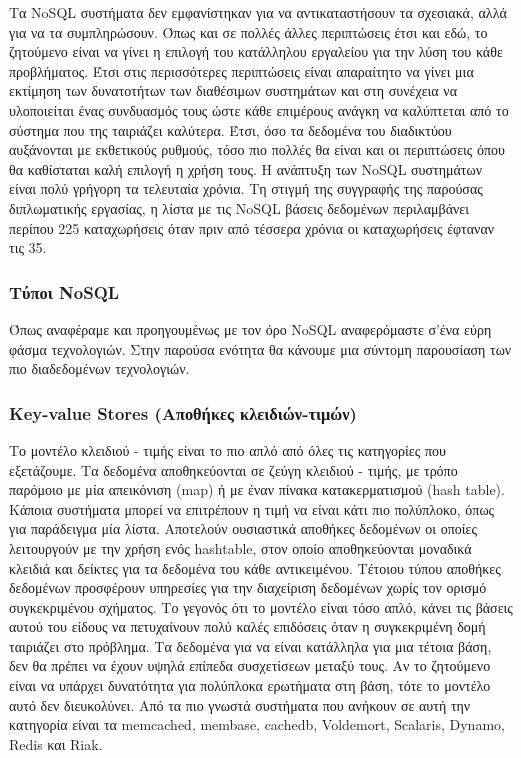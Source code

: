 	Τα NoSQL συστήματα δεν εμφανίστηκαν για να αντικαταστήσουν τα σχεσιακά, αλλά για να τα συμπληρώσουν. Όπως και σε πολλές άλλες περιπτώσεις έτσι και εδώ, το ζητούμενο είναι να γίνει η επιλογή του κατάλληλου εργαλείου για την λύση του κάθε προβλήματος. Έτσι στις περισσότερες περιπτώσεις είναι απαραίτητο να γίνει μια εκτίμηση των δυνατοτήτων των διαθέσιμων συστημάτων και στη συνέχεια να υλοποιείται ένας συνδυασμός τους ώστε κάθε επιμέρους ανάγκη να καλύπτεται από το σύστημα που της ταιριάζει καλύτερα. Έτσι, όσο τα δεδομένα του διαδικτύου αυξάνονται με εκθετικούς ρυθμούς, τόσο πιο πολλές θα είναι και οι περιπτώσεις όπου θα καθίσταται καλή επιλογή η χρήση τους. Η ανάπτυξη των NoSQL συστημάτων είναι πολύ γρήγορη τα τελευταία χρόνια. Τη στιγμή της συγγραφής της παρούσας διπλωματικής εργασίας, η λίστα με τις NoSQL βάσεις δεδομένων περιλαμβάνει περίπου 225 καταχωρήσεις όταν πριν από τέσσερα χρόνια οι καταχωρήσεις έφταναν τις 35\cite{numberOfNoSQL}.
		
		\subsubsection{Τύποι NoSQL}
		Όπως αναφέραμε και προηγουμένως με τον όρο NoSQL αναφερόμαστε σ'ένα εύρη φάσμα τεχνολογιών. Στην παρούσα ενότητα θα κάνουμε μια σύντομη παρουσίαση των πιο διαδεδομένων τεχνολογιών.
		
		\subsubsection{Key-value Stores (Αποθήκες κλειδιών-τιμών)}
		Το μοντέλο κλειδιού - τιμής είναι το πιο απλό από όλες τις κατηγορίες που εξετάζουμε. Τα δεδομένα αποθηκεύονται σε ζεύγη κλειδιού - τιμής, με τρόπο παρόμοιο με μία απεικόνιση (map) ή με έναν πίνακα κατακερματισμού (hash table). Κάποια συστήματα μπορεί να επιτρέπουν η τιμή να είναι κάτι πιο πολύπλοκο, όπως για παράδειγμα μία λίστα. Αποτελούν ουσιαστικά αποθήκες δεδομένων οι οποίες λειτουργούν με την χρήση ενός hashtable, στον οποίο αποθηκεύονται μοναδικά κλειδιά και δείκτες για τα δεδομένα του κάθε αντικειμένου. Τέτοιου τύπου αποθήκες δεδομένων προσφέρουν υπηρεσίες για την διαχείριση δεδομένων χωρίς τον ορισμό συγκεκριμένου σχήματος. Το γεγονός ότι το μοντέλο είναι τόσο απλό, κάνει τις βάσεις αυτού του είδους να πετυχαίνουν πολύ καλές επιδόσεις όταν η συγκεκριμένη δομή ταιριάζει στο πρόβλημα. Τα δεδομένα για να είναι κατάλληλα για μια τέτοια βάση, δεν θα πρέπει να έχουν υψηλά επίπεδα συσχετίσεων μεταξύ τους. Αν το ζητούμενο είναι να υπάρχει δυνατότητα για πολύπλοκα ερωτήματα στη βάση, τότε το μοντέλο αυτό δεν διευκολύνει. Από τα πιο γνωστά συστήματα που ανήκουν σε αυτή την κατηγορία είναι τα memcached, membase, cachedb, Voldemort, Scalaris, Dynamo, Redis και Riak\cite{DeCandia:2007:DAH:1323293.1294281}\cite{seeger2009key}.
		
